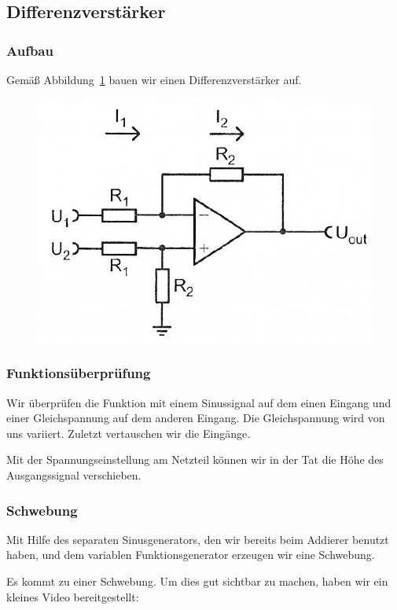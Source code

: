 \FloatBarrier
\subsection{Differenzverstärker}

\subsubsection{Aufbau}

Gemäß Abbildung~\ref{fig:5_6-7} bauen wir einen Differenzverstärker auf.

\begin{figure}[htbp]
	\centering
	\includegraphics[width=.6\linewidth]{Anleitung/5_6-7.png}
	\caption{%
		\cite[Abbildung~5/6.7]{physik313-Anleitung}
	}
	\label{fig:5_6-7}
\end{figure}

\subsubsection{Funktionsüberprüfung}

Wir überprüfen die Funktion mit einem Sinussignal auf dem einen Eingang und
einer Gleichspannung auf dem anderen Eingang. Die Gleichspannung wird von uns
variiert. Zuletzt vertauschen wir die Eingänge.

Mit der Spannungseinstellung am Netzteil können wir in der Tat die Höhe des
Ausgangssignal verschieben.

\subsubsection{Schwebung}

Mit Hilfe des separaten Sinusgenerators, den wir bereits beim Addierer benutzt
haben, und dem variablen Funktionsgenerator erzeugen wir eine Schwebung.

Es kommt zu einer Schwebung. Um dies gut sichtbar zu machen, haben wir ein
kleines Video bereitgestellt:

